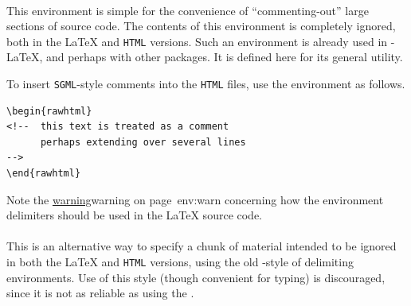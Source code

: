 %
%
\paragraph*{\label{comment}}
\begin{changebar}
This environment is simple for the convenience of ``commenting-out''
large sections of source code.
The contents of this environment is completely ignored,
both in the \LaTeX{} and \texttt{HTML} versions.
Such an environment is already used in \AmS-\LaTeX,
and perhaps with other packages.
It is defined here for its general utility.

\noindent
To insert \texttt{SGML}-style comments into the \texttt{HTML} files,
use the  environment as follows.
\begin{small}
\begin{verbatim}
\begin{rawhtml}
<!--  this text is treated as a comment
      perhaps extending over several lines 
-->
\end{rawhtml}
\end{verbatim}
\end{small}
\end{changebar}%

\noindent
Note the \hyperref[page]{warning}{warning on page~}{}{env:warn}
concerning how the environment delimiters should be used in the
\LaTeX{} source code.


%
\paragraph*{\label{endcomment}}
\begin{changebar}
This is an alternative way to specify a chunk of material intended
to be ignored in both the \LaTeX{} and \texttt{HTML} versions,
using the old \AmS-style of delimiting environments.
Use of this style (though convenient for typing) is discouraged,
since it is not as reliable as using the  .
\end{changebar}\html{\\}


